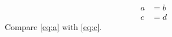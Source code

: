 \documentclass{article}
\begin{document}
\begin{align}
a &= b \label{eq:a}\\
c &= d \label{eq:c}
\end{align}
Compare \autoref{eq:a} with \eqref{eq:c}.
\end{document}
